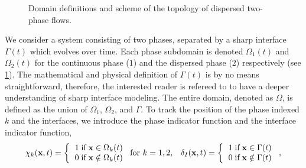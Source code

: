 \begin{figure}[h!]
    \centering
    \caption{Domain definitions and scheme of the topology of dispersed two-phase flows.}
    \label{fig:Scheme}
\end{figure}
We consider a system consisting of two phases, separated by a sharp interface $\Gamma(t)$ which evolves over time. 
Each phase subdomain is denoted $\Omega_1(t)$ and $\Omega_2(t)$ for the continuous phase ($1$) and the dispersed phase ($2$) respectively (see \ref{fig:Scheme}). 
The mathematical and physical definition of $\Gamma(t)$ is by no means straightforward, therefore, the interested reader is refereed to \cite{bothe2022sharp} to have a deeper understanding of sharp interface modeling. 
The entire domain, denoted as $\Omega$, is defined as the union of $\Omega_1$, $\Omega_2$, and $\Gamma$.
To track the position of the phase indexed $k$ and the interfaces, we introduce the phase indicator function and the interface indicator function, 
\begin{align}
    \chi_k(\textbf{x},t) =  \left\{
      \begin{tabular}{cc}
        $1 \;\text{if} \;\textbf{x} \in \Omega_k(t)$\\
        $0 \;\text{if} \;\textbf{x} \notin \Omega_k(t)$
      \end{tabular}
      \right.
      \text{for $k = 1,2$},
    && \delta_I(\textbf{x},t) =  \left\{
      \begin{tabular}{cc}
        $1 \;\text{if} \;\textbf{x} \in \Gamma(t)$\\
        $0 \;\text{if} \;\textbf{x} \notin \Gamma(t)$
      \end{tabular}
      \right.,
\end{align}
